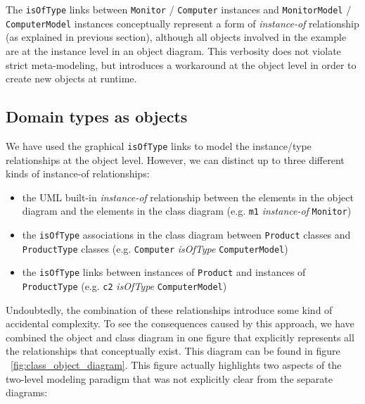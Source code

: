 The \texttt{isOfType} links between \texttt{Monitor} / \texttt{Computer} instances and \texttt{MonitorModel} / \texttt{ComputerModel} instances conceptually represent a form of \textit{instance-of} relationship (as explained in previous section), although all objects involved in the example are at the instance level in an object diagram. This verbosity does not violate strict meta-modeling, but introduces a workaround at the object level in order to create new objects at runtime.

\subsection{Domain types as objects}

We have used the graphical \texttt{isOfType} links to model the instance/type relationships at the object level. However, we can distinct up to three different kinds of instance-of relationships:

\begin{itemize}
\item{the UML built-in \textit{instance-of} relationship between the elements in the object diagram and the elements in the class diagram (e.g. \texttt{m1} \textit{instance-of} \texttt{Monitor})}
\item{the \texttt{isOfType} associations in the class diagram between \texttt{Product} classes and \texttt{ProductType} classes (e.g. \texttt{Computer} \textit{isOfType} \texttt{ComputerModel})}
\item{the \texttt{isOfType} links between instances of \texttt{Product} and instances of \texttt{ProductType} (e.g. \texttt{c2} \textit{isOfType} \texttt{ComputerModel})}
\end{itemize}
Undoubtedly, the combination of these relationships introduce some kind of accidental complexity. To see the consequences caused by this approach, we have combined the object and class diagram in one figure that explicitly represents all the relationships that conceptually exist. This diagram can be found in figure ~\ref{fig:class_object_diagram}. This figure actually highlights two aspects of the two-level modeling paradigm that was not explicitly clear from the separate diagrams:

